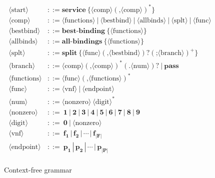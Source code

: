 \documentclass{sig-alternate-per}
\begin{document}
\begin{figure}[!t]
{\scriptsize
  \begin{align*}
  \langle\text{start}\rangle & ::= \textbf{service}~\textbf{\{} \langle\text{comp}\rangle (\textbf{,}\langle\text{comp}\rangle)^*\textbf{\}} \\ 
  \langle\text{comp}\rangle & ::= \langle\text{functions}\rangle  ~|~\langle\text{bestbind}\rangle ~|~\langle\text{allbinds}\rangle ~|~\langle\text{splt}\rangle ~|~\langle\text{func}\rangle \\ 
\langle\text{bestbind}\rangle & ::= \textbf{best-binding}~\textbf{\{} \langle\text{functions}\rangle \textbf{\}} \\ 
  \langle\text{allbinds}\rangle & ::= \textbf{all-bindings}~\textbf{\{} \langle\text{functions}\rangle \textbf{\}} \\ 
  \langle\text{splt}\rangle & ::= \textbf{split}~\textbf{\{} \langle\text{func}\rangle (\textbf{,}\langle\text{bestbind}\rangle)? (\textbf{;} \langle\text{branch}\rangle)^+ \textbf{\}} \\ 
  \langle\text{branch}\rangle & ::= \langle\text{comp}\rangle (\textbf{,}\langle\text{comp}\rangle)^* (\textbf{.}\langle\text{num}\rangle)? ~|~ \textbf{pass} \\ 
  \langle\text{functions}\rangle & ::= \langle\text{func}\rangle (\textbf{,}\langle\text{functions}\rangle)^* \\ 
  \langle\text{func}\rangle & ::= \langle\text{vnf}\rangle ~|~ \langle\text{endpoint}\rangle \\
  \langle\text{num}\rangle & ::= \langle\text{nonzero}\rangle~\langle\text{digit}\rangle^* \\
  \langle\text{nonzero}\rangle & ::= ~\textbf{1}~|~\textbf{2}~|~\textbf{3}~|~\textbf{4}~|~\textbf{5}~|~\textbf{6}~|~\textbf{7}~|~\textbf{8}~|~\textbf{9} \\
  \langle\text{digit}\rangle & ::= ~\textbf{0}~|~\langle\text{nonzero}\rangle \\
  \langle\text{vnf}\rangle & ::= ~\boldsymbol{f_1}\,|\,\boldsymbol{f_2}\,|\,\dotsb\,|\,\boldsymbol{f_{|F|}} \\ 
  \langle\text{endpoint}\rangle & ::= ~\boldsymbol{p_1}\,|\,\boldsymbol{p_2}\,|\,\dotsb\,|\,\boldsymbol{p_{|P|}} \\ 
  \end{align*}
}
\vspace{-18pt}
\caption{Context-free grammar}
\label{fig:grammar}
\end{figure}
\end{document}
